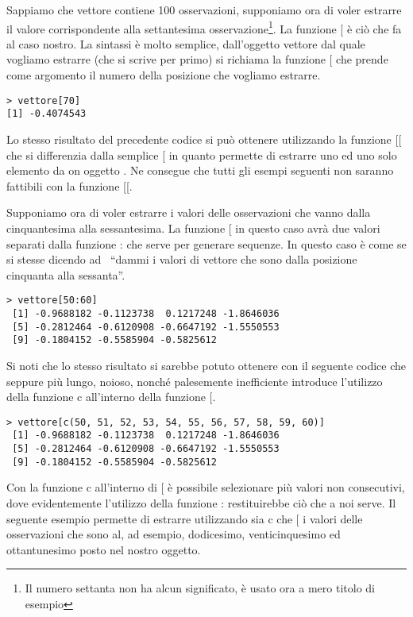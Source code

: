 Sappiamo che \textsf{vettore} contiene 100 osservazioni, supponiamo ora di voler estrarre il valore corrispondente alla settantesima osservazione\footnote{Il numero settanta non ha alcun significato, è usato ora a mero titolo di esempio}. La funzione [ è ciò che fa al caso nostro. La sintassi è molto semplice, dall'oggetto vettore dal quale vogliamo estrarre (che si scrive per primo) si richiama la funzione [ che prende come argomento il numero della posizione che vogliamo estrarre.
\begin{lstlisting}
> vettore[70]
[1] -0.4074543
\end{lstlisting}

Lo stesso risultato del precedente codice si può ottenere utilizzando la funzione \textsf{[[} che si differenzia dalla semplice \textsf{[} in quanto permette di estrarre uno ed uno solo elemento da on oggetto \erre. Ne consegue che tutti gli esempi seguenti non saranno fattibili con la funzione \textsf{[[}.

Supponiamo ora di voler estrarre i valori delle osservazioni che vanno dalla cinquantesima alla sessantesima. La funzione [ in questo caso avrà due valori separati dalla funzione \textsf{:} che serve per generare sequenze. In questo caso è come se si stesse dicendo ad \erre\ ``dammi i valori di vettore che sono dalla posizione cinquanta alla sessanta''.
\begin{lstlisting}
> vettore[50:60]
 [1] -0.9688182 -0.1123738  0.1217248 -1.8646036
 [5] -0.2812464 -0.6120908 -0.6647192 -1.5550553
 [9] -0.1804152 -0.5585904 -0.5825612
\end{lstlisting}

Si noti che lo stesso risultato si sarebbe potuto ottenere con il seguente codice che seppure più lungo, noioso, nonché palesemente inefficiente introduce l'utilizzo della funzione \textsf{c} all'interno della funzione \textsf{[}.
\begin{lstlisting}
> vettore[c(50, 51, 52, 53, 54, 55, 56, 57, 58, 59, 60)]
 [1] -0.9688182 -0.1123738  0.1217248 -1.8646036
 [5] -0.2812464 -0.6120908 -0.6647192 -1.5550553
 [9] -0.1804152 -0.5585904 -0.5825612
\end{lstlisting}

Con la funzione \textsf{c} all'interno di \textsf{[} è possibile selezionare più valori non consecutivi, dove evidentemente l'utilizzo della funzione \textsf{:} restituirebbe ciò che a noi serve. Il seguente esempio permette di estrarre utilizzando sia \textsf{c} che \textsf{[} i valori delle osservazioni che sono al, ad esempio, dodicesimo, venticinquesimo ed ottantunesimo posto nel nostro oggetto.

